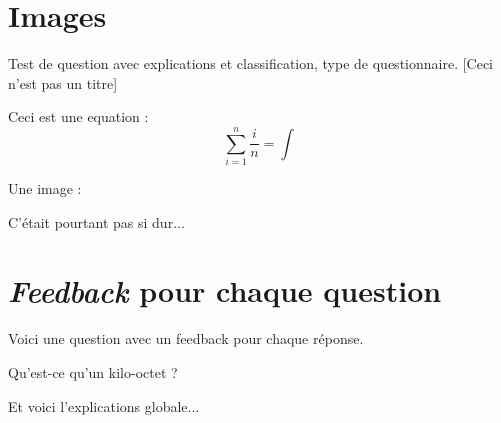 \documentclass[12pt,a4paper]{article}
\begin{document}
\section{Images}

\begin{question}
\qoneline

Test de question avec explications et classification, type de questionnaire. [Ceci n'est pas un titre]

Ceci est une equation :
$$\sum_{i=1}^n \frac{i}{n}=\int$$

Une image : 



\begin{answers}

\end{answers}

\begin{explanations}
C'était pourtant pas si dur...
\end{explanations}

\end{question}

\section{\emph{Feedback} pour chaque question}

\begin{question}

Voici une question avec un feedback pour chaque réponse.

Qu'est-ce qu'un kilo-octet ?


\begin{answers}
	

\end{answers}

\begin{explanations}
Et voici l'explications globale...
\end{explanations}

\end{question}
\end{document}
